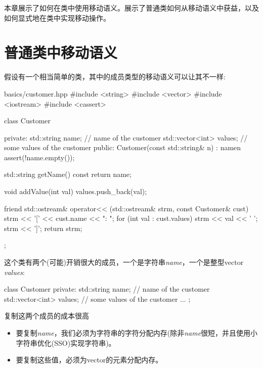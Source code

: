 
本章展示了如何在类中使用移动语义。展示了普通类如何从移动语义中获益，以及如何显式地在类中实现移动操作。\par


\section{普通类中移动语义}

假设有一个相当简单的类，其中的成员类型的移动语义可以让其不一样:\par

\begin{codeboxt}[cpp]{basics/customer.hpp}
#include <string>
#include <vector>
#include <iostream>
#include <cassert>

class Customer {
private:
  std::string name; // name of the customer
  std::vector<int> values; // some values of the customer
public:
  Customer(const std::string& n)
  : name{n} {
    assert(!name.empty());
  }

  std::string getName() const {
    return name;
  }

  void addValue(int val) {
    values.push_back(val);
  }

  friend std::ostream& operator<< (std::ostream& strm, const Customer& cust) {
    strm << '[' << cust.name << ": ";
    for (int val : cust.values) {
      strm << val << ' ';
    }
    strm << ']';
    return strm;
  }
};
\end{codeboxt}

这个类有两个(可能)开销很大的成员，一个是字符串\textit{name}，一个是整型vector \textit{values}:\par

\begin{codebox}[cpp]
class Customer {
private:
  std::string name; // name of the customer
  std::vector<int> values; // some values of the customer
  ...
};
\end{codebox}

复制这两个成员的成本很高\par

\begin{itemize}
  \item 要复制\textit{name}，我们必须为字符串的字符分配内存(除非\textit{name}很短，并且使用小字符串优化(SSO)实现字符串)。
  \item 要复制这些值，必须为vector的元素分配内存。
\end{itemize}

